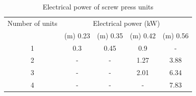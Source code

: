 \documentclass[10pt,a4paper]{article}
\begin{document}
\begin{table}[H] 
	\begin{adjustwidth}{}{}
		\centering
		\caption{Electrical power of screw press units \protect{}} \label{table:ScrewPress_power}
		\begin{tabular}{c c c c c}
			\toprule
			\multicolumn{1}{c}{Number of units } &\multicolumn{4}{c}{Electrical power (kW)}\\
			\cmidrule(lr){2-5}
			&\diameter(m) 0.23 & \diameter(m) 0.35 & \diameter(m) 0.42 & \diameter(m) 0.56	\\ \midrule
			1 		& 0.3 & 0.45 & 0.9 & -	\\
			2 	& -						& - 	& 1.27 & 3.88 	\\
			3	& -						& - 					& 2.01 & 6.34 	\\
			4 	& -						& - 					& - & 7.83 \\
			\bottomrule
		\end{tabular}
	\end{adjustwidth}
\end{table}
\end{document}
